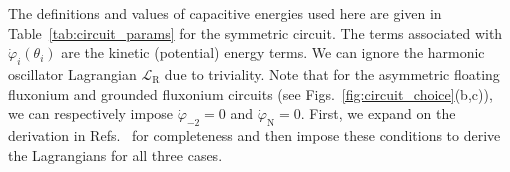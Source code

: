 \documentclass[%
reprint,
superscriptaddress,
 amsmath,amssymb,
 aps,
 prx,
longbibliography,
floatfix,
]{revtex4-2}
\begin{document}
The definitions and values of capacitive energies used here are given in Table~\ref{tab:circuit_params} for the symmetric circuit. The terms associated with $\dot{\varphi}_i (\theta_i)$ are the kinetic (potential) energy terms. We can ignore the harmonic oscillator Lagrangian $\mathcal{L}_\textrm{R}$ due to triviality. Note that for the asymmetric floating fluxonium and grounded fluxonium circuits (see Figs.~\ref{fig:circuit_choice}(b,c)), we can respectively impose $\dot{\varphi}_{-2}=0$ and $\dot{\varphi}_{\textrm{N}}=0$. First, we expand on the derivation in Refs.~\cite{ferguson2013symmetries,viola2015collective} for completeness and then impose these conditions to derive the Lagrangians for all three cases.
\end{document}
